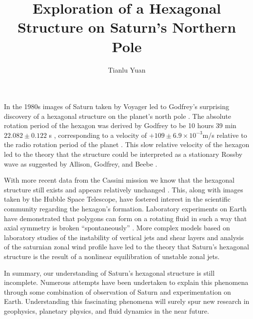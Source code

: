 \documentclass[11pt]{article} %
\newcommand{\subtitle}[1]{%
  \posttitle{%
    \par\end{center}
    \begin{center}\large#1\end{center}
    \vskip0.5em}%
}
\begin{document}
\title{Exploration of a Hexagonal Structure on
  Saturn's Northern Pole}
\subtitle{Topic Proposal}
\author{Tianlu Yuan}
\maketitle

In the 1980s images of Saturn taken by Voyager led to Godfrey's surprising
discovery of a hexagonal structure on the planet's north pole
\cite{Godfrey1988}.  The absolute rotation period of the hexagon was derived by
Godfrey to be 10 hours 39 min $22.082\pm0.122$ s \cite{Godfrey1990},
corresponding to a velocity of  $+109 \pm 6.9 \times 10^{-3}$m/s
relative to the radio rotation period of the planet \cite{Godfrey1990}.
This slow relative velocity of the hexagon led to the theory that the
structure could be interpreted as a stationary Rossby wave as
suggested by Allison, Godfrey, and Beebe \cite{Allison19900203}.

With more recent data from the Cassini mission we know that the
hexagonal structure still exists and appears relatively unchanged
\cite{BarbosaAguiar2010}.  This, along with images taken by the Hubble
Space Telescope, have fostered interest in the scientific community
regarding the hexagon's formation.  Laboratory
experiments on Earth have demonstrated that polygons can form on a
rotating fluid in such a way that axial symmetry is broken
``spontaneously'' \cite{Jansson2006}.  More complex models based on
laboratory studies of the instability of vertical jets and shear
layers and analysis of the saturnian zonal wind profile have led to the theory that Saturn's
hexagonal structure is the result of a nonlinear equilibration 
of unstable zonal jets\cite{BarbosaAguiar2010}.  

In summary, our understanding of Saturn's hexagonal structure is still
incomplete.  Numerous attempts have been undertaken to explain this
phenomena through some combination of observation of Saturn and
experimentation on Earth.  Understanding this fascinating phenomena
will surely spur new research in geophysics, planetary physics,
and fluid dynamics in the near future.


\end{document}
